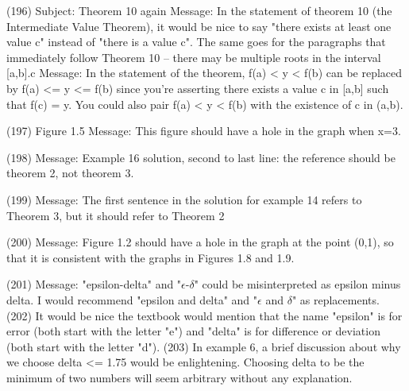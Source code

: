 {(196)  Subject: Theorem 10 again  Message: In the statement of theorem 10 (the Intermediate Value Theorem), it would be nice to say "there exists at least one value c" instead of "there is a value c". The same goes for the paragraphs that immediately follow Theorem 10 -- there may be multiple roots in the interval [a,b].c    Message: In the statement of the theorem, f(a) < y < f(b) can be replaced by f(a) <= y <= f(b) since you're asserting there exists a value c in [a,b] such that f(c) = y. You could also pair f(a) < y < f(b) with the existence of c in (a,b).
%
%

(197)  Figure 1.5   Message: This figure should have a hole in the graph when x=3.

(198)  Message: Example 16 solution, second to last line: the reference should be theorem 2, not theorem 3.

(199)  Message: The first sentence in the solution for example 14 refers to Theorem 3, but it should refer to Theorem 2

(200)  Message: Figure 1.2 should have a hole in the graph at the point (0,1), so that it is consistent with the graphs in Figures 1.8 and 1.9.

(201)  Message: "epsilon-delta" and "$\epsilon$-$\delta$" could be misinterpreted as epsilon minus delta. I would recommend "epsilon and delta" and "$\epsilon$ and $\delta$" as replacements.       
(202)  It would be nice the textbook would mention that the name "epsilon" is for error (both start with the letter "e") and "delta" is for difference or deviation (both start with the letter "d").       
(203)  In example 6, a brief discussion about why we choose delta <= 1.75 would be enlightening. Choosing delta to be the minimum of two numbers will seem arbitrary without any explanation.

}
